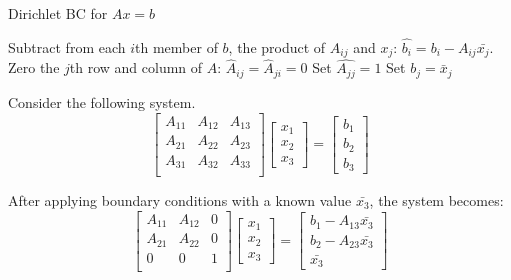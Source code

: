 \documentclass[en]{minipw} %
\begin{document}
\begin{algorithm}
\caption{Dirichlet BC for $Ax=b$}\label{euclid}
\begin{algorithmic}[1]
\State Subtract from each $i$th member of $b$, the product of $A_{ij}$ and $x_{j}$: $\hat{b_i} = b_i - A_{ij}\bar{x_{j}}$.
\State Zero the $j$th row and column of $A$: $\hat{A}_{ij} = \hat{A}_{ji} = 0$
\State Set $\hat{A_{jj}} = 1$
\State Set $b_{j} = \bar{x}_j$
\EndFor
\EndProcedure
\end{algorithmic}
\end{algorithm}

\begin{example}
Consider the following system.
\begin{equation}
\begin{bmatrix}
A_{11} & A_{12} & A_{13} \\
A_{21} & A_{22} & A_{23} \\
A_{31} & A_{32} & A_{33} \\
\end{bmatrix}
\begin{bmatrix}
x_{1}\\
x_{2}\\
x_{3}
\end{bmatrix}
=
\begin{bmatrix}
b_{1}\\
b_{2}\\
b_{3}
\end{bmatrix}
\end{equation}

After applying boundary conditions with a known value $\bar{x_{3}}$, the system becomes:
\begin{equation}
\begin{bmatrix}
A_{11} & A_{12} & 0 \\
A_{21} & A_{22} & 0 \\
0 & 0 & 1 \\
\end{bmatrix}
\begin{bmatrix}
x_{1}\\
x_{2}\\
x_{3}
\end{bmatrix}
=
\begin{bmatrix}
b_{1} - A_{13} \bar{x_{3}} \\
b_{2} - A_{23} \bar{x_{3}}\\
\bar{x_{3}}
\end{bmatrix}
\end{equation}

\end{example}
\end{document}
